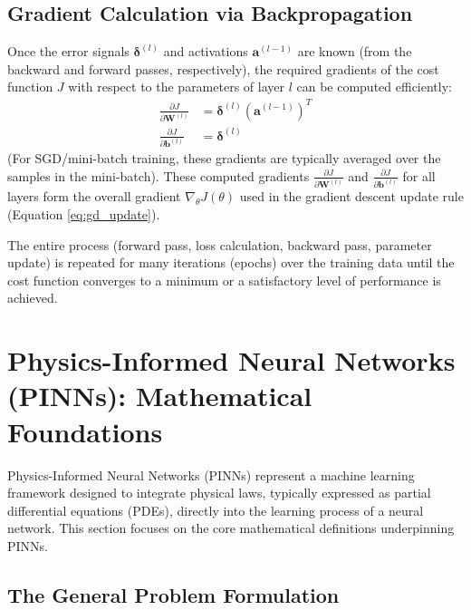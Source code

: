 \documentclass[11pt,twoside,openright]{report}
\begin{document}
\subsection{Gradient Calculation via Backpropagation}
Once the error signals $\bm{\delta}^{(l)}$ and activations $\mathbf{a}^{(l-1)}$ are known (from the backward and forward passes, respectively), the required gradients of the cost function $J$ with respect to the parameters of layer $l$ can be computed efficiently:
\begin{align}
    \frac{\partial J}{\partial \mathbf{W}^{(l)}} &= \bm{\delta}^{(l)} (\mathbf{a}^{(l-1)})^T \label{eq:grad_W} \\
    \frac{\partial J}{\partial \mathbf{b}^{(l)}} &= \bm{\delta}^{(l)} \label{eq:grad_b}
\end{align}
(For SGD/mini-batch training, these gradients are typically averaged over the samples in the mini-batch). These computed gradients $\frac{\partial J}{\partial \mathbf{W}^{(l)}}$ and $\frac{\partial J}{\partial \mathbf{b}^{(l)}}$ for all layers form the overall gradient $\nabla_\theta J(\theta)$ used in the gradient descent update rule (Equation \ref{eq:gd_update}).

The entire process (forward pass, loss calculation, backward pass, parameter update) is repeated for many iterations (epochs) over the training data until the cost function converges to a minimum or a satisfactory level of performance is achieved.





\section{Physics-Informed Neural Networks (PINNs): Mathematical Foundations}

Physics-Informed Neural Networks (PINNs) represent a machine learning framework designed to integrate physical laws, typically expressed as partial differential equations (PDEs), directly into the learning process of a neural network. This section focuses on the core mathematical definitions underpinning PINNs.

\subsection{The General Problem Formulation}
\end{document}
